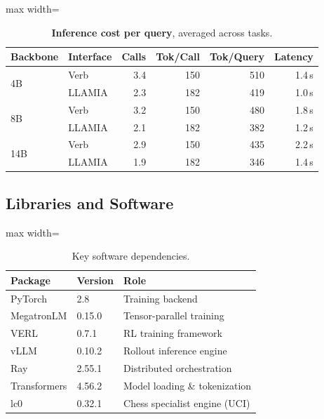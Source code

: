\begin{table}[h]
\centering
\caption{\textbf{Inference cost per query}, averaged across tasks.}
\label{tab:cost_infer}
\begin{adjustbox}{max width=\columnwidth}
\small
\begin{tabular}{llrrrr}
\toprule[1.2pt]
\textbf{Backbone} & \textbf{Interface} & \textbf{Calls} & \textbf{Tok/Call} & \textbf{Tok/Query} & \textbf{Latency} \\
\midrule
\multirow{2}{*}{4B}  & Verb   & 3.4 & 150 & 510 & 1.4\,s \\
                     & LLAMIA & 2.3 & 182 & 419 & 1.0\,s \\
\multirow{2}{*}{8B}  & Verb   & 3.2 & 150 & 480 & 1.8\,s \\
                     & LLAMIA & 2.1 & 182 & 382 & 1.2\,s \\
\multirow{2}{*}{14B} & Verb   & 2.9 & 150 & 435 & 2.2\,s \\
                     & LLAMIA & 1.9 & 182 & 346 & 1.4\,s \\
\bottomrule[1.2pt]
\end{tabular}
\end{adjustbox}
\end{table}

\subsection{Libraries and Software}
\label{sec:app_libraries}

\begin{table}[h]
\centering
\small
\begin{adjustbox}{max width=\columnwidth}
\begin{tabular}{lll}
\toprule
\textbf{Package} & \textbf{Version} & \textbf{Role} \\
\midrule
PyTorch           & 2.8             & Training backend \\
MegatronLM        & 0.15.0              & Tensor-parallel training \\
VERL              & 0.7.1           & RL training framework \\
vLLM              & 0.10.2          & Rollout inference engine \\
Ray               & 2.55.1          & Distributed orchestration \\
Transformers      & 4.56.2          & Model loading \& tokenization \\
lc0               & 0.32.1          & Chess specialist engine (UCI) \\
\bottomrule
\end{tabular}
\end{adjustbox}
\vspace{2mm}\caption{Key software dependencies.}
\label{tab:libraries}
\end{table}

